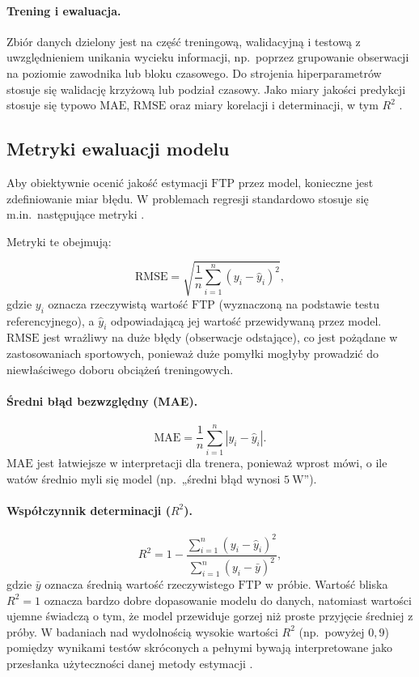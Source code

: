 \paragraph{Trening i ewaluacja.}
Zbiór danych dzielony jest na część treningową, walidacyjną i testową z uwzględnieniem unikania wycieku informacji, np.\ poprzez grupowanie obserwacji na poziomie zawodnika lub bloku czasowego.
Do strojenia hiperparametrów stosuje się walidację krzyżową lub podział czasowy.
Jako miary jakości predykcji stosuje się typowo $\mathrm{MAE}$, $\mathrm{RMSE}$ oraz miary korelacji i determinacji, w tym $R^2$ \cite{james2021isl,hastie2009esl}.

\subsection{Metryki ewaluacji modelu}

Aby obiektywnie ocenić jakość estymacji $\mathrm{FTP}$ przez model, konieczne jest zdefiniowanie miar błędu.
W problemach regresji standardowo stosuje się m.in.\ następujące metryki \cite{james2021isl,hastie2009esl}.

Metryki te obejmują:

\begin{equation}
\label{eq:rmse}
\mathrm{RMSE} = \sqrt{\frac{1}{n}\sum_{i=1}^{n}\left(y_i - \hat{y}_i\right)^2},
\end{equation}
gdzie $y_i$ oznacza rzeczywistą wartość $\mathrm{FTP}$ (wyznaczoną na podstawie testu referencyjnego), a $\hat{y}_i$ odpowiadającą jej wartość przewidywaną przez model.
$\mathrm{RMSE}$ jest wrażliwy na duże błędy (obserwacje odstające), co jest pożądane w zastosowaniach sportowych, ponieważ duże pomyłki mogłyby prowadzić do niewłaściwego doboru obciążeń treningowych.

\paragraph{Średni błąd bezwzględny (MAE).}
\begin{equation}
\label{eq:mae}
\mathrm{MAE} = \frac{1}{n}\sum_{i=1}^{n}\left|y_i - \hat{y}_i\right|.
\end{equation}
$\mathrm{MAE}$ jest łatwiejsze w interpretacji dla trenera, ponieważ wprost mówi, o ile watów średnio myli się model (np.\ „średni błąd wynosi $5\ \mathrm{W}$”).

\paragraph{Współczynnik determinacji ($R^2$).}
\begin{equation}
\label{eq:r2}
R^2 = 1 - \frac{\sum_{i=1}^{n}\left(y_i - \hat{y}_i\right)^2}{\sum_{i=1}^{n}\left(y_i - \bar{y}\right)^2},
\end{equation}
gdzie $\bar{y}$ oznacza średnią wartość rzeczywistego $\mathrm{FTP}$ w próbie.
Wartość bliska $R^2 = 1$ oznacza bardzo dobre dopasowanie modelu do danych, natomiast wartości ujemne świadczą o tym, że model przewiduje gorzej niż proste przyjęcie średniej z próby.
W badaniach nad wydolnością wysokie wartości $R^2$ (np.\ powyżej $0{,}9$) pomiędzy wynikami testów skróconych a pełnymi bywają interpretowane jako przesłanka użyteczności danej metody estymacji \cite{karsten2021cpftp}.